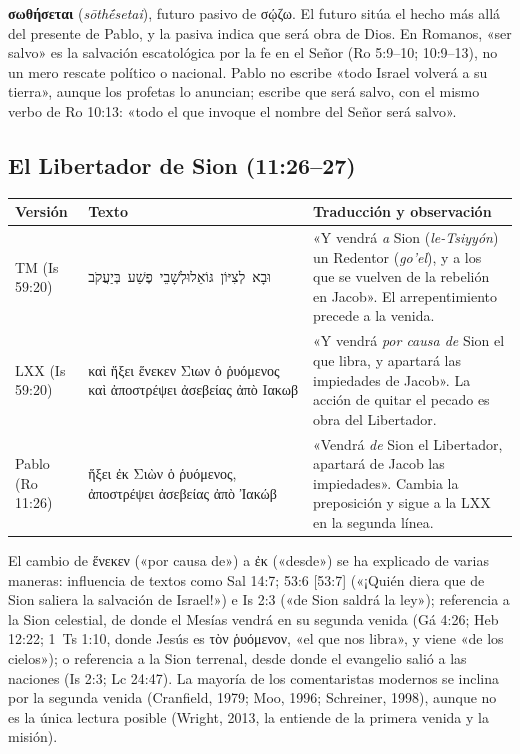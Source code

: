 \documentclass[11pt,letterpaper]{article}
\newcommand{\heb}[1]{\mbox{\foreignlanguage{hebrew}{#1}}}
\newcommand{\grc}[1]{\foreignlanguage{ancientgreek}{#1}}
\begin{document}
\textbf{\grc{σωθήσεται}} (\emph{sōthḗsetai}), futuro pasivo de \grc{σῴζω}. El futuro sitúa el hecho más allá del presente de Pablo, y la pasiva indica que será obra de Dios. En Romanos, «ser salvo» es la salvación escatológica por la fe en el Señor (Ro 5:9--10; 10:9--13), no un mero rescate político o nacional. Pablo no escribe «todo Israel volverá a su tierra», aunque los profetas lo anuncian; escribe que será salvo, con el mismo verbo de Ro 10:13: «todo el que invoque el nombre del Señor será salvo».

\subsection{El Libertador de Sion (11:26--27)}

\begin{center}\small
\renewcommand{\arraystretch}{1.35}
\begin{tabular}{>{\RaggedRight\arraybackslash}p{2.1cm}>{\RaggedRight\arraybackslash}p{5.0cm}>{\RaggedRight\arraybackslash}p{6.8cm}}
\toprule
\textbf{Versión} & \textbf{Texto} & \textbf{Traducción y observación}\\
\midrule
TM (Is 59:20) & \heb{וּבָא לְצִיּוֹן גּוֹאֵל}\newline\heb{וּלְשָׁבֵי פֶשַׁע בְּיַעֲקֹב} & «Y vendrá \emph{a} Sion (\emph{le-Tsiyyón}) un Redentor (\emph{go'el}), y a los que se vuelven de la rebelión en Jacob». El arrepentimiento precede a la venida.\\
LXX (Is 59:20) & \grc{καὶ ἥξει ἕνεκεν Σιων ὁ ῥυόμενος καὶ ἀποστρέψει ἀσεβείας ἀπὸ Ιακωβ} & «Y vendrá \emph{por causa de} Sion el que libra, y apartará las impiedades de Jacob». La acción de quitar el pecado es obra del Libertador.\\
Pablo (Ro 11:26) & \grc{ἥξει ἐκ Σιὼν ὁ ῥυόμενος, ἀποστρέψει ἀσεβείας ἀπὸ Ἰακώβ} & «Vendrá \emph{de} Sion el Libertador, apartará de Jacob las impiedades». Cambia la preposición y sigue a la LXX en la segunda línea.\\
\bottomrule
\end{tabular}\end{center}

El cambio de \grc{ἕνεκεν} («por causa de») a \grc{ἐκ} («desde») se ha explicado de varias maneras: influencia de textos como Sal 14:7; 53:6 [53:7] («¡Quién diera que de Sion saliera la salvación de Israel!») e Is 2:3 («de Sion saldrá la ley»); referencia a la Sion celestial, de donde el Mesías vendrá en su segunda venida (Gá 4:26; Heb 12:22; 1~Ts 1:10, donde Jesús es \grc{τὸν ῥυόμενον}, «el que nos libra», y viene «de los cielos»); o referencia a la Sion terrenal, desde donde el evangelio salió a las naciones (Is 2:3; Lc 24:47). La mayoría de los comentaristas modernos se inclina por la segunda venida (Cranfield, 1979; Moo, 1996; Schreiner, 1998), aunque no es la única lectura posible (Wright, 2013, la entiende de la primera venida y la misión).
\end{document}
